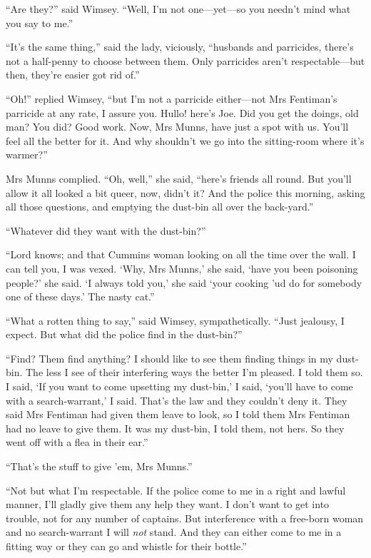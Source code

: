 \enquote{Are they?} said Wimsey. \enquote{Well, I'm not one\allowbreak---\allowbreak yet---so you needn't mind what you say to me.}

\enquote{It's the same thing,} said the lady, viciously, \enquote{husbands and parricides, there's not a half-penny to choose between them. Only parricides aren't respectable\allowbreak---\allowbreak but then, they're easier got rid of.}

\enquote{Oh!} replied Wimsey, \enquote{but I'm not a parricide either\allowbreak---\allowbreak not Mrs Fentiman's parricide at any rate, I assure you. Hullo! here's Joe. Did you get the doings, old man? You did? Good work. Now, Mrs Munns, have just a spot with us. You'll feel all the better for it. And why shouldn't we go into the sitting-room where it's warmer?}

Mrs Munns complied. \enquote{Oh, well,} she said, \enquote{here's friends all round. But you'll allow it all looked a bit queer, now, didn't it? And the police this morning, asking all those questions, and emptying the dust-bin all over the back-yard.}

\enquote{Whatever did they want with the dust-bin?}

\enquote{Lord knows; and that Cummins woman looking on all the time over the wall. I can tell you, I was vexed. \enquote{Why, Mrs Munns,} she said, \enquote{have you been poisoning people?} she said. \enquote{I always told you,} she said \enquote{your cooking 'ud do for somebody one of these days.} The nasty cat.}

\enquote{What a rotten thing to say,} said Wimsey, sympathetically. \enquote{Just jealousy, I expect. But what did the police find in the dust-bin?}

\enquote{Find? Them find anything? I should like to see them finding things in my dust-bin. The less I see of their interfering ways the better I'm pleased. I told them so. I said, \enquote{If you want to come upsetting my dust-bin,} I said, \enquote{you'll have to come with a search-warrant,} I said. That's the law and they couldn't deny it. They said Mrs Fentiman had given them leave to look, so I told them Mrs Fentiman had no leave to give them. It was my dust-bin, I told them, not hers. So they went off with a flea in their ear.}

\enquote{That's the stuff to give 'em, Mrs Munns.}

\enquote{Not but what I'm respectable. If the police come to me in a right and lawful manner, I'll gladly give them any help they want. I don't want to get into trouble, not for any number of captains. But interference with a free-born woman and no search-warrant I will \textit{not} stand. And they can either come to me in a fitting way or they can go and whistle for their bottle.}

